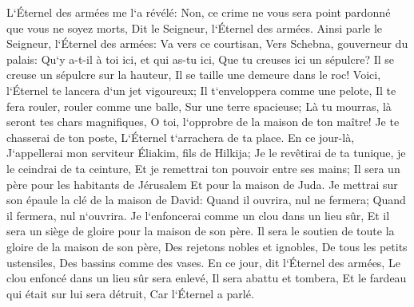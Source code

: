 \verse L`Éternel des armées me l`a révélé: Non, ce crime ne vous sera point pardonné que vous ne soyez morts, Dit le Seigneur, l`Éternel des armées. 
\verse Ainsi parle le Seigneur, l`Éternel des armées: Va vers ce courtisan, Vers Schebna, gouverneur du palais: 
\verse Qu`y a-t-il à toi ici, et qui as-tu ici, Que tu creuses ici un sépulcre? Il se creuse un sépulcre sur la hauteur, Il se taille une demeure dans le roc! 
\verse Voici, l`Éternel te lancera d`un jet vigoureux; Il t`enveloppera comme une pelote, 
\verse Il te fera rouler, rouler comme une balle, Sur une terre spacieuse; Là tu mourras, là seront tes chars magnifiques, O toi, l`opprobre de la maison de ton maître! 
\verse Je te chasserai de ton poste, L`Éternel t`arrachera de ta place. 
\verse En ce jour-là, J`appellerai mon serviteur Éliakim, fils de Hilkija; 
\verse Je le revêtirai de ta tunique, je le ceindrai de ta ceinture, Et je remettrai ton pouvoir entre ses mains; Il sera un père pour les habitants de Jérusalem Et pour la maison de Juda. 
\verse Je mettrai sur son épaule la clé de la maison de David: Quand il ouvrira, nul ne fermera; Quand il fermera, nul n`ouvrira. 
\verse Je l`enfoncerai comme un clou dans un lieu sûr, Et il sera un siège de gloire pour la maison de son père. 
\verse Il sera le soutien de toute la gloire de la maison de son père, Des rejetons nobles et ignobles, De tous les petits ustensiles, Des bassins comme des vases. 
\verse En ce jour, dit l`Éternel des armées, Le clou enfoncé dans un lieu sûr sera enlevé, Il sera abattu et tombera, Et le fardeau qui était sur lui sera détruit, Car l`Éternel a parlé. 

